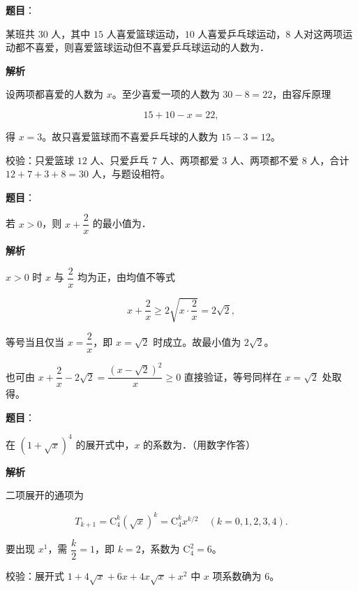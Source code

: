 \begin{answer}

\textbf{题目}：

某班共 $30$ 人，其中 $15$ 人喜爱篮球运动，$10$ 人喜爱乒乓球运动，$8$ 人对这两项运动都不喜爱，则喜爱篮球运动但不喜爱乒乓球运动的人数为\gkblank{}．

\textbf{解析}

设两项都喜爱的人数为 $x$。至少喜爱一项的人数为 $30-8=22$，由容斥原理

\nopagebreak[4]
\[15+10-x=22,\]

得 $x=3$。故只喜爱篮球而不喜爱乒乓球的人数为 $15-3=12$。

校验：只爱篮球 $12$ 人、只爱乒乓 $7$ 人、两项都爱 $3$ 人、两项都不爱 $8$ 人，合计 $12+7+3+8=30$ 人，与题设相符。


\end{answer}
\begin{answer}

\textbf{题目}：

若 $x>0$，则 $x+\dfrac2x$ 的最小值为\gkblank{}．

\textbf{解析}

$x>0$ 时 $x$ 与 $\dfrac2x$ 均为正，由均值不等式

\nopagebreak[4]
\[x+\frac2x\geqslant2\sqrt{x\cdot\frac2x}=2\sqrt2,\]

等号当且仅当 $x=\dfrac2x$，即 $x=\sqrt2$ 时成立。故最小值为 $2\sqrt2$。

也可由 $x+\dfrac2x-2\sqrt2=\dfrac{\left(x-\sqrt2\right)^2}{x}\geqslant0$ 直接验证，等号同样在 $x=\sqrt2$ 处取得。


\end{answer}
\begin{answer}

\textbf{题目}：

在 $(1+\sqrt x)^4$ 的展开式中，$x$ 的系数为\gkblank{}．（用数字作答）

\textbf{解析}

二项展开的通项为

\nopagebreak[4]
\[T_{k+1}=\mathrm C_4^k\left(\sqrt x\right)^k=\mathrm C_4^k x^{k/2}\quad(k=0,1,2,3,4).\]

要出现 $x^1$，需 $\dfrac k2=1$，即 $k=2$，系数为 $\mathrm C_4^2=6$。

校验：展开式 $1+4\sqrt x+6x+4x\sqrt x+x^2$ 中 $x$ 项系数确为 $6$。


\end{answer}
